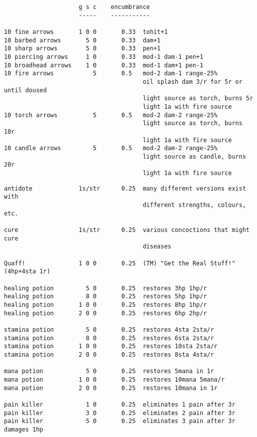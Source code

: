 \small
\begin{verbatim}
                     g s c    encumbrance
                     -----    -----------

10 fine arrows       1 0 0       0.33  tohit+1
10 barbed arrows       5 0       0.33  dam+1
10 sharp arrows        5 0       0.33  pen+1
10 piercing arrows     1 0       0.33  mod-1 dam-1 pen+1
10 broadhead arrows    1 0       0.33  mod-1 dam+1 pen-1
10 fire arrows           5       0.5   mod-2 dam-1 range-25%
                                       oil splash dam 3/r for 5r or until doused
                                       light source as torch, burns 5r
                                       light 1a with fire source
10 torch arrows          5       0.5   mod-2 dam-2 range-25%
                                       light source as torch, burns 10r
                                       light 1a with fire source
10 candle arrows         5       0.5   mod-2 dam-2 range-25%
                                       light source as candle, burns 20r
                                       light 1a with fire source

\end{verbatim} \pagebreak[1] \begin{verbatim}
antidote             1s/str      0.25  many different versions exist with
                                       different strengths, colours, etc.

cure                 1s/str      0.25  various concoctions that might cure
                                       diseases

Quaff!               1 0 0       0.25  (TM) "Get the Real Stuff!"  (4hp+4sta 1r)

healing potion         5 0       0.25  restores 3hp 1hp/r
healing potion         8 0       0.25  restores 5hp 1hp/r
healing potion       1 0 0       0.25  restores 8hp 1hp/r
healing potion       2 0 0       0.25  restores 6hp 2hp/r

stamina potion         5 0       0.25  restores 4sta 2sta/r
stamina potion         8 0       0.25  restores 6sta 2sta/r
stamina potion       1 0 0       0.25  restores 10sta 2sta/r
stamina potion       2 0 0       0.25  restores 8sta 4sta/r

mana potion            5 0       0.25  restores 5mana in 1r
mana potion          1 0 0       0.25  restores 10mana 5mana/r
mana potion          2 0 0       0.25  restores 10mana in 1r

pain killer            1 0       0.25  eliminates 1 pain after 3r
pain killer            3 0       0.25  eliminates 2 pain after 3r
pain killer            5 0       0.25  eliminates 3 pain after 3r damages 1hp


\end{verbatim}
